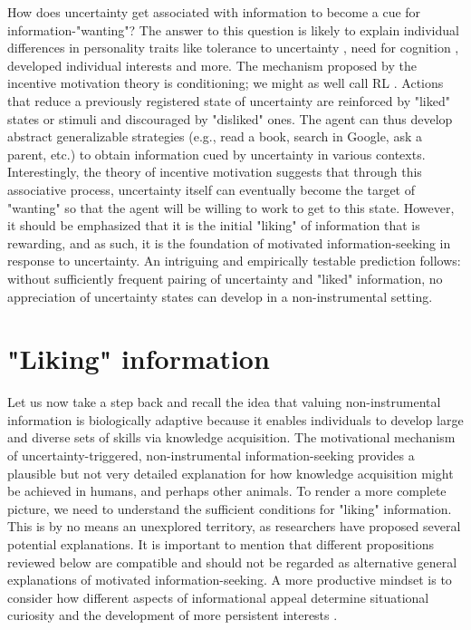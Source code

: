 How does uncertainty get associated with information to become a cue for information-"wanting"? The answer to this question is likely to explain individual differences in personality traits like tolerance to uncertainty \parencite{hillen_tolerance_2017}, need for cognition \parencite{cacioppo_need_1982}, developed individual interests \parencite{hidi_four-phase_2006} and more. The mechanism proposed by the incentive motivation theory is conditioning; we might as well call \ac{RL} \parencite{maia_reinforcement_2009}. Actions that reduce a previously registered state of uncertainty are reinforced by "liked" states or stimuli and discouraged by "disliked" ones. The agent can thus develop abstract generalizable strategies (e.g., read a book, search in Google, ask a parent, etc.) to obtain information cued by uncertainty in various contexts. Interestingly, the theory of incentive motivation suggests that through this associative process, uncertainty itself can eventually become the target of "wanting" so that the agent will be willing to work to get to this state. However, it should be emphasized that it is the initial "liking" of information that is rewarding, and as such, it is the foundation of motivated information-seeking in response to uncertainty. An intriguing and empirically testable prediction follows: without sufficiently frequent pairing of uncertainty and "liked" information, no appreciation of uncertainty states can develop in a non-instrumental setting.

\section{"Liking" information}\label{CH2_S_liking_information}

Let us now take a step back and recall the idea that valuing non-instrumental information is biologically adaptive because it enables individuals to develop large and diverse sets of skills via knowledge acquisition. The motivational mechanism of uncertainty-triggered, non-instrumental information-seeking provides a plausible but not very detailed explanation for how knowledge acquisition might be achieved in humans, and perhaps other animals. To render a more complete picture, we need to understand the sufficient conditions for "liking" information. This is by no means an unexplored territory, as researchers have proposed several potential explanations. It is important to mention that different propositions reviewed below are compatible and should not be regarded as alternative general explanations of motivated information-seeking. A more productive mindset is to consider how different aspects of informational appeal determine situational curiosity and the development of more persistent interests \parencite{kobayashi_diverse_2019,bromberg-martin_value_2020,fitzgibbon_lure_2021}.

